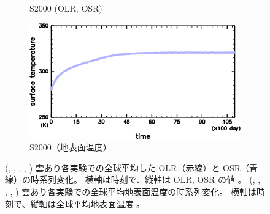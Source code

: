 \documentclass[body]{subfiles}
\begin{document}
\begin{figure}[t]
\begin{subfigure}{.4\textwidth}
		\caption{S2000 (OLR, OSR)}\label{S2000_OLRA}
	\end{subfigure}
	\begin{subfigure}{.4\textwidth}
		\centering
		\includegraphics[width=\textwidth]{S2000/S2000_SurfTemp_horimean_time0.0-10950.0-crop.png}
		\caption{S2000（地表面温度）}\label{S2000_SurfTemp}
	\end{subfigure}
	\caption[雲あり各実験での全球平均 OLR, OSR, 地表面温度の時系列変化]{
		(, , ,
		, )
		雲あり各実験での全球平均した OLR（赤線）と OSR（青線）の時系列変化。
		横軸は時刻で、縦軸は OLR, OSR の値 \hmu*{[W/m^{2}]}。
		(, , ,
		, )
		雲あり各実験での全球平均地表面温度の時系列変化。
		横軸は時刻で、縦軸は全球平均地表面温度 \hmu*{[K]}。
	}\label{time}
\end{figure}
\end{document}

